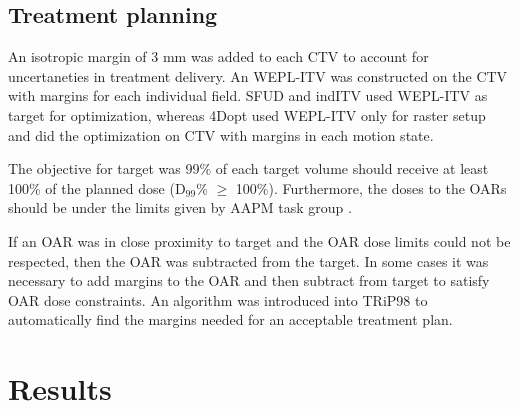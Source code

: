 \documentclass[type=dr, dr=rernat, accentcolor=tud7b,colorbacktitle, bigchapter, openright, twoside, 12pt ]{tudthesis}
\begin{document}
\subsection{Treatment planning}

An isotropic margin of 3 mm was added to each CTV to account for uncertaneties in treatment delivery. An WEPL-ITV was constructed on the CTV with margins for each individual field. 
SFUD and indITV used WEPL-ITV as target for optimization, whereas 4Dopt used WEPL-ITV only for raster setup and did the optimization on CTV with margins in each motion state.
  
The objective for target was 99\% of each target volume should receive at least 100\% of the planned dose (D$_{99}$\% $\geq$ 100\%). Furthermore, the doses to the OARs should be under the limits given by AAPM task group \cite{Benedict2010}. 

If an OAR was in close proximity to target and the OAR dose limits could not be respected, then the OAR was subtracted from the target. In some cases it was necessary to add margins to the OAR and then subtract from target to satisfy OAR dose constraints.
An algorithm was introduced into TRiP98 to automatically find the margins needed for an acceptable treatment plan.

\section{Results}
\end{document}

